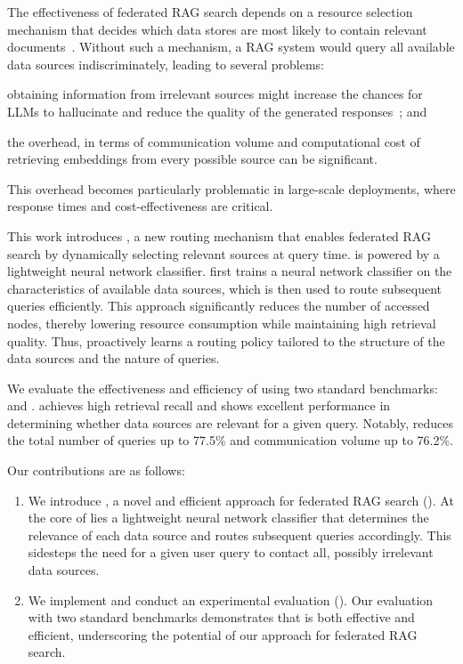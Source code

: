 The effectiveness of federated \ac{RAG} search depends on a resource selection mechanism that decides which data stores are most likely to contain relevant documents~\cite{wang2024feb4rag}.
Without such a mechanism, a \ac{RAG} system would query all available data sources indiscriminately, leading to several  problems:
\begin{enumerate*}[label=\emph{(\roman*)}]
\item obtaining information from irrelevant sources might increase the chances for \acp{LLM} to hallucinate and reduce the quality of the generated responses~\cite{wang2024feb4rag}; and 
\item the overhead, in terms of communication volume and computational cost of retrieving embeddings from every possible source can be significant.
\end{enumerate*}
This overhead becomes particularly problematic in large-scale deployments, where response times and cost-effectiveness are critical.









This work introduces \sys, a new routing mechanism that enables federated \ac{RAG} search by dynamically selecting relevant sources at query time.
\sys is powered by a lightweight neural network classifier.
\sys first trains a neural network classifier on the characteristics of available data sources, which is then used to route subsequent queries efficiently.
This approach significantly reduces the number of accessed nodes, thereby lowering resource consumption while maintaining high retrieval quality.
Thus, \sys proactively learns a routing policy tailored to the structure of the data sources and the nature of queries.

We evaluate the effectiveness and efficiency of \sys using two standard benchmarks: \mirage and \mmlu.
\sys achieves high retrieval recall and shows excellent performance in determining whether data sources are relevant for a given query.
Notably, \sys reduces the total number of queries up to 77.5\% and communication volume up to 76.2\%.

Our contributions are as follows:

\begin{enumerate}
    \item We introduce \sys, a novel and efficient approach for federated \ac{RAG} search ().
    At the core of \sys lies a lightweight neural network classifier that determines the relevance of each data source and routes subsequent queries accordingly.
    This sidesteps the need for a given user query to contact all, possibly irrelevant data sources.
    \item We implement \sys and conduct an experimental evaluation ().
    Our evaluation with two standard benchmarks demonstrates that \sys is both effective and efficient, underscoring the potential of our approach for federated \ac{RAG} search.
\end{enumerate}




